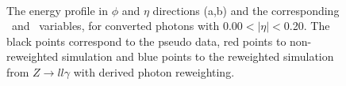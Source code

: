 \begin{figure}[ht]
    \centering
	 \\
    \caption{The energy profile in $\phi$ and $\eta$ directions (a,b) and the corresponding \Rphi \ and \Reta \ variables, for converted photons with 0.00$<|\eta|<$0.20. The black points correspond to the pseudo data, red points to non-reweighted simulation and blue points to the reweighted simulation from $Z\rightarrow ll\gamma$ with derived photon reweighting.}
    \label{Photon:3}
\end{figure}

